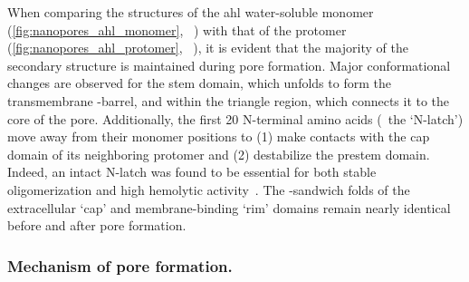 When comparing the structures of the \gls{ahl} water-soluble monomer (\cref{fig:nanopores_ahl_monomer},
~\cite{Sugawara-2015}) with that of the protomer (\cref{fig:nanopores_ahl_protomer},
~\cite{Song-1996}), it is evident that the majority of the secondary structure is maintained
during pore formation. Major conformational changes are observed for the stem domain, which unfolds to form
the transmembrane \tb-barrel, and within the triangle region, which connects it to the core of the pore.
Additionally, the first 20 N-terminal amino acids (\ie~the `N-latch') move away from their monomer positions
to (1) make contacts with the cap domain of its neighboring protomer and (2) destabilize the prestem domain.
Indeed, an intact N-latch was found to be essential for both stable oligomerization and high hemolytic
activity~\cite{Song-1996}. The \tb-sandwich folds of the extracellular `cap' and membrane-binding `rim'
domains remain nearly identical before and after pore formation.

\subsubsection{Mechanism of pore formation.}
%

